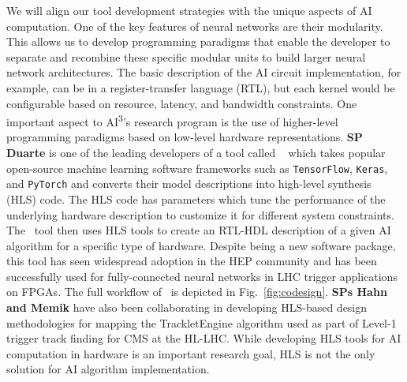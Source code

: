 We will align our tool development strategies with the unique aspects of AI computation. One of the key features of neural networks are their modularity. This allows us to develop programming paradigms that enable the developer to separate and recombine these specific modular units to build larger neural network architectures. The basic description of the AI circuit implementation, for example, can be in a register-transfer language (RTL), but each kernel would be configurable based on resource, latency, and bandwidth constraints.   
One important aspect to AI\textsuperscript{3}'s research program is the use of higher-level programming paradigms based on low-level hardware representations.  
\textbf{SP Duarte} is one of the leading developers of a tool called \hlsfml~\cite{Duarte:2018ite} which takes popular open-source machine learning software frameworks such as {\tt TensorFlow}, {\tt Keras}, and {\tt PyTorch} and converts their model descriptions into high-level synthesis (HLS) code. The HLS code has parameters which tune the performance of the underlying hardware description to customize it for different system constraints.  The \hlsfml~tool then uses HLS tools to create an RTL-HDL description of a given AI algorithm for a specific type of hardware.  Despite being a new software package, this tool has seen widespread adoption in the HEP community and has been successfully used for fully-connected neural networks in LHC trigger applications on FPGAs.  The full workflow of \hlsfml~is depicted in Fig.~\ref{fig:codesign}. \textbf{SPs Hahn and Memik} have also been collaborating in developing HLS-based design methodologies for mapping the TrackletEngine algorithm used as part of Level-1 trigger track finding for CMS at the HL-LHC. 
While developing HLS tools for AI computation in hardware is an important research goal, HLS is not the only solution for AI algorithm implementation.  
